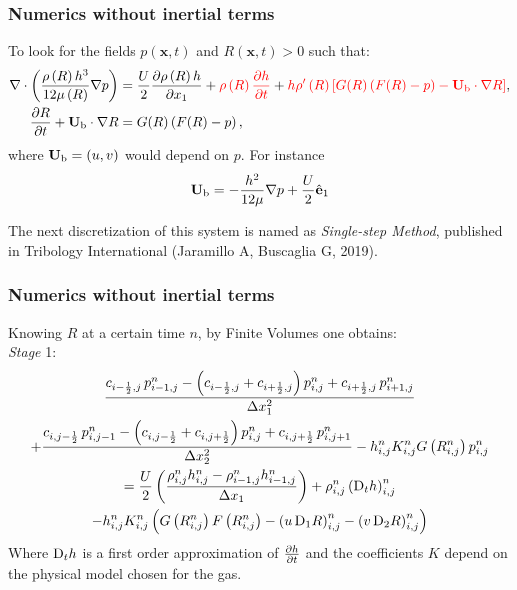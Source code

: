 \documentclass[10pt,aspectratio=169]{beamer}
\begin{document}
\begin{frame}[noframenumbering]\frametitle{Numerics without inertial terms}
To look for the fields $p(\mathbf{x},t)$ and $R(\mathbf{x},t)>0$ such that:
\begin{align*}
\nabla\cdot\left(\frac{\rho\left(R\right) h^3}{12\mu\left(R\right) }\nabla p \right)&=\frac{U}{2}\frac{\partial \rho\left(R\right) h}{\partial x_1}+{\color{red}\rho\left(R\right)\frac{\partial  h}{\partial t}}+{\color{red}h\rho'\left(R\right)\left[G(R)\left(F(R)-p\right)-\mathbf{U}_{\textnormal{\scriptsize{b}}}\cdot \nabla R\right]},\\
\frac{\partial R}{\partial t}+\mathbf{U}_{\textnormal{\scriptsize{b}}}\cdot \nabla R&=G(R)\left(F(R)-p\right),
\end{align*}
where $\mathbf{U}_{\textnormal{\scriptsize{b}}}=(u,v)$ would depend on $p$. For instance
$$\mathbf{U}_{\textnormal{\scriptsize{b}}}=-\frac{h^2}{12\mu}\nabla p+\frac{U}{2}\hat{\mathbf{e}}_1$$

The next discretization of this system is named as \emph{Single-step Method}, published in Tribology International (Jaramillo A, Buscaglia G, 2019).
\end{frame}


\begin{frame}\frametitle{Numerics without inertial terms}\vspace*{0.5cm}
Knowing $R$ at a certain time $n$, by Finite Volumes one obtains:\\
\bigskip
\emph{Stage} 1:
\begin{multline}
\frac{c_{i-\frac{1}{2},j}\,p^n_{i-1,j}-\left(c_{i-\frac{1}{2},j}+c_{i+\frac{1}{2},j}\right)p^n_{i,j}+c_{i+\frac{1}{2},j}\,p^n_{i+1,j}}{\Delta x_1^2} \\ 
+\frac{c_{i,j-\frac{1}{2}}\,p^n_{i,j-1}-\left(c_{i,j-\frac{1}{2}}+c_{i,j+\frac{1}{2}}\right)p^n_{i,j}+c_{i,j+\frac{1}{2}}\,p^n_{i,j+1}}{\Delta x_2^2} -h_{i,j}^nK^n_{i,j} G\left(R^n_{i,j}\right) p_{i,j}^n
\\= \frac{U}{2}\left(\frac{\rho^n_{i,j}h^n_{i,j}-\rho^n_{i-1,j}h^n_{i-1,j}}{\Delta x_1}\right)+\rho^n_{i,j}\left(\textnormal{D}_th\right)^n_{i,j}\\- h^n_{i,j}K^{n}_{i,j}\left(G\left(R_{i,j}^n\right)F\left(R_{i,j}^n\right)-\left(u\,\textnormal{D}_1R\right)^{n}_{i,j}-\left(v\,\textnormal{D}_2R\right)^{n}_{i,j}\right)
\end{multline}
Where $\textnormal{D}_th$ is a first order approximation of $\frac{\partial h}{\partial t}$ and the coefficients $K$ depend on the physical model chosen for the gas.
\end{frame}
\end{document}
